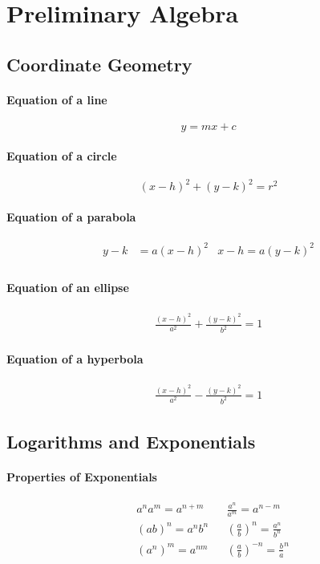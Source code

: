 \section{Preliminary Algebra}
\subsection{Coordinate Geometry}
\paragraph{Equation of a line}
$$y = mx + c$$
\paragraph{Equation of a circle}
$${(x-h)}^2 + {(y-k)}^2 = r^2$$
\paragraph{Equation of a parabola}
\begin{align*}
y - k &= a{(x-h)}^2 & x-h = a{(y-k)^2} \\
\end{align*}
\paragraph{Equation of an ellipse}
\begin{align*}
\frac{{(x-h)}^2}{a^2} + \frac{{(y-k)}^2}{b^2} = 1
\end{align*}
\paragraph{Equation of a hyperbola}
\begin{align*}
\frac{{(x-h)}^2}{a^2} - \frac{{(y-k)}^2}{b^2} = 1
\end{align*}


\subsection{Logarithms and Exponentials}
\paragraph{Properties of Exponentials}
\begin{align*}
		&a^n a^m = a^{n+m} & &\frac{a^n}{a^m}   = a^{n-m}\\
		&(a b)^n = a^n  b^n & &\left({\frac{a}{b}}\right)^n  = \frac{a^n}{b^n}\\
		&(a^n)^m = a^{n m} & &\left({\frac{a}{b}}\right)^{-n} = {\frac{b}{a}}^{n}\\
\end{align*}
